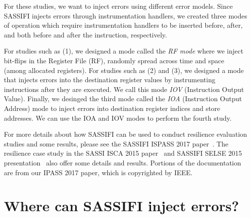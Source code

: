 For these studies, we want to inject errors using different error models. Since
SASSIFI injects errors through instrumentation handlers, we created three modes
of operation which require instrumentation handlers to be inserted before,
after, and both before and after the instruction, respectively. 

For studies such as (1), we designed a mode called the {\it RF mode} where we
inject bit-flips in the Register File (RF), randomly spread across time and
space (among allocated registers).  For studies such as (2) and (3), we
designed a mode that injects errors into the destination register values by
instrumenting instructions after they are executed. We call this mode {\it IOV}
(Instruction Output Value). Finally, we desinged the third mode called the {\it
IOA} (Instruction Output Address) mode to inject errors into destination
register indices and store addresses. We can use the IOA and IOV modes to
perform the fourth study. 

For more details about how SASSIFI can be used to conduct resilience evaluation
studies and some results, please see the SASSIFI ISPASS 2017
paper~\cite{SASSIFI_ISPASS}.  The resilience case study in the SASSI ISCA 2015
paper~\cite{SASSI_ISCA} and SASSIFI SELSE 2015
presentation~\cite{SASSIFI_SELSE} also offer some details and results. 
Portions of the documentation are from our IPASS 2017 paper, which is
copyrighted by IEEE.


\section{Where can SASSIFI inject errors?}
\label{sec:where}

